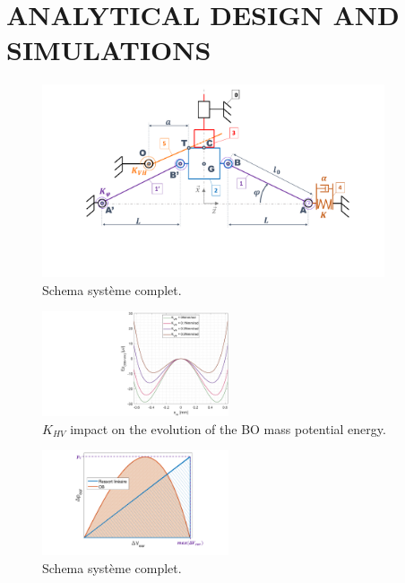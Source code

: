 \documentclass[3p,twocolumn,preprint]{elsarticle}
\begin{document}
\section{ANALYTICAL DESIGN AND SIMULATIONS}
\label{MODELING}
\begin{figure}[!htbp]
	\centering
	\captionsetup{justification=centering}
	\includegraphics[trim={0cm 0cm 0cm 0cm},clip, width=0.9\textwidth]{figures/schema_cinematique1.pdf}
	\caption{Schema système complet.}
	\label{fig:schema_cinematique1}
\end{figure}
\lipsum[1]
\begin{figure}[!htbp]
	\centering
	\captionsetup{justification=centering}
	\includegraphics[trim={14cm 0cm 0cm 0cm},clip, width=0.49\textwidth]{figures/(Ep)_vs_(x_m)_avec_plusieurs_K_VH.pdf}
	\caption{$K_{HV}$ impact on the evolution of the BO mass potential energy.}
	\label{fig:(Ep)_vs_(x_m)_avec_plusieurs_K_VH}
\end{figure}
\begin{figure}[!htbp]
	\centering
	\captionsetup{justification=centering}
	\includegraphics[trim={6cm 1cm 4cm 0.5cm},clip, width=0.49\textwidth]{figures/force_elastique_lineaire_vs_OB.pdf}
	\caption{Schema système complet.}
	\label{fig:force_elastique_lineaire_vs_OB}
\end{figure}
\end{document}
